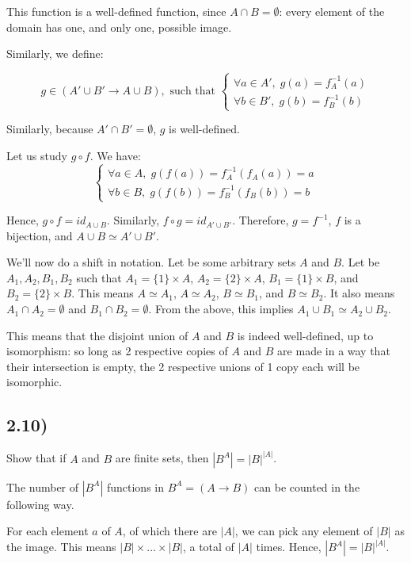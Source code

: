 \documentclass[12pt, letterpaper, twoside]{report}
\begin{document}
This function is a well-defined function, since $A \cap B = \emptyset$: every element of the domain has one, and only one, possible image.

Similarly, we define:

$$
g \in (A' \cup B' \to A \cup B),
\text{ such that }
\begin{cases}
	\forall a \in A', \; g(a) = f_A^{-1}(a) \\
	\forall b \in B', \; g(b) = f_B^{-1}(b)
\end{cases}
$$

Similarly, because $A' \cap B' = \emptyset$, $g$ is well-defined.

Let us study $g \circ f$. We have:
$$
\begin{cases}
	\forall a \in A, \; g(f(a)) = f_A^{-1}(f_A(a)) = a \\
	\forall b \in B, \; g(f(b)) = f_B^{-1}(f_B(b)) = b
\end{cases}
$$

Hence, $g \circ f = id_{A \cup B}$.
Similarly, $f \circ g = id_{A' \cup B'}$.
Therefore, $g = f^{-1}$, $f$ is a bijection, and $A \cup B \simeq A' \cup B'$.

We'll now do a shift in notation. Let be some arbitrary sets $A$ and $B$. Let be $A_1, A_2, B_1, B_2$ such that $A_1 = \{ 1 \} \times A$, $A_2 = \{ 2 \} \times A$, $B_1 = \{ 1 \} \times B$, and $B_2 = \{ 2 \} \times B$. This means $A \simeq A_1$, $A \simeq A_2$, $B \simeq B_1$, and $B \simeq B_2$. It also means $A_1 \cap A_2 = \emptyset$ and $B_1 \cap B_2 = \emptyset$. From the above, this implies $A_1 \cup B_1 \simeq A_2 \cup B_2$.

This means that the disjoint union of $A$ and $B$ is indeed well-defined, up to isomorphism: so long as 2 respective copies of $A$ and $B$ are made in a way that their intersection is empty, the 2 respective unions of 1 copy each will be isomorphic.



\subsection*{2.10)}

Show that if $A$ and $B$ are finite sets, then $|B^A| = |B|^{|A|}$.

The number of $|B^A|$ functions in $B^A = (A \to B)$ can be counted in the following way.

For each element $a$ of $A$, of which there are $|A|$, we can pick any element of $|B|$ as the image. This means $|B| \times ... \times |B|$, a total of $|A|$ times. Hence, $|B^A| = |B|^{|A|}$.
\end{document}
